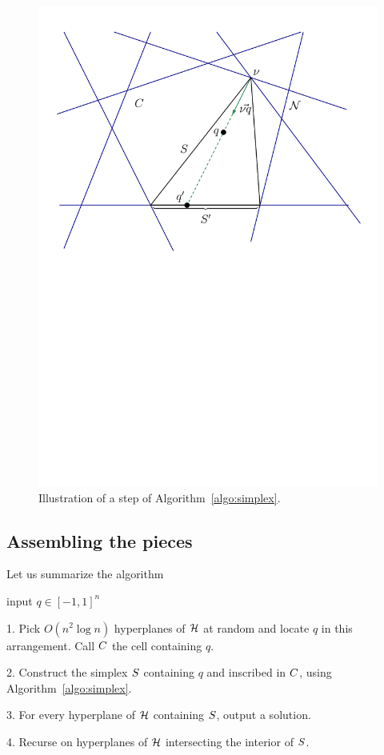 \begin{figure}
\begin{center}
\includegraphics[trim=90 47 50 13,clip=true,height=0.25\textheight]{figures/simplex}
\caption{%
Illustration of a step of Algorithm~\ref{algo:simplex}.
}
\label{fig:meiser:step}
\end{center}
\end{figure}

\subsection{Assembling the pieces}

Let us summarize the algorithm
\begin{algorithm}\label{algo:meiser}
\item[input] \(q \in {[-1,1]}^n\)
\item[1.] Pick \(O(n^2 \log n)\) hyperplanes of $\mathcal{H}$ at random and locate $q$
in this arrangement. Call $C$ the cell containing $q$.
\item[2.] Construct the simplex \(S\) containing \(q\) and inscribed in
\(C\), using Algorithm~\ref{algo:simplex}.
\item[3.] For every hyperplane of $\mathcal{H}$ containing $S$, output a solution.
\item[4.] Recurse on hyperplanes of $\mathcal{H}$ intersecting the interior of $S$.
\end{algorithm}

